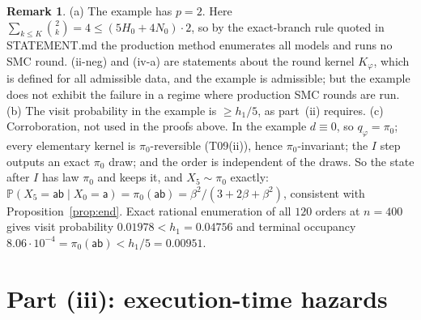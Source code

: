 \documentclass[11pt]{article}
\theoremstyle{definition}
\newtheorem{remark}[theorem]{Remark}
\renewcommand{\Pr}{\mathbb P}
\newcommand{\ph}{\varphi}
\newcommand{\sa}{\mathsf a}
\newcommand{\sab}{\mathsf{ab}}
\begin{document}
\begin{remark}\label{rem:ex}
(a) The example has $p=2$. Here $\sum_{k\le K}\binom{2}{k}=4\le(5H_0+4N_0)\cdot2$, so by the exact-branch rule quoted in STATEMENT.md the production method enumerates all models and runs no SMC round. (ii-neg) and (iv-a) are statements about the round kernel $K_\ph$, which is defined for all admissible data, and the example is admissible; but the example does not exhibit the failure in a regime where production SMC rounds are run. (b) The visit probability in the example is $\ge h_1/5$, as part~(ii) requires. (c) Corroboration, not used in the proofs above. In the example $d\equiv0$, so $q_\ph=\pi_0$; every elementary kernel is $\pi_0$-reversible (T09(ii)), hence $\pi_0$-invariant; the $I$ step outputs an exact $\pi_0$ draw; and the order is independent of the draws. So the state after $I$ has law $\pi_0$ and keeps it, and $X_5\sim\pi_0$ exactly: $\Pr(X_5=\sab\mid X_0=\sa)=\pi_0(\sab)=\beta^2/(3+2\beta+\beta^2)$, consistent with Proposition~\ref{prop:end}. Exact rational enumeration of all $120$ orders at $n=400$ gives visit probability $0.01978<h_1=0.04756$ and terminal occupancy $8.06\cdot10^{-4}=\pi_0(\sab)<h_1/5=0.00951$.
\end{remark}

\section{Part (iii): execution-time hazards}
\end{document}
